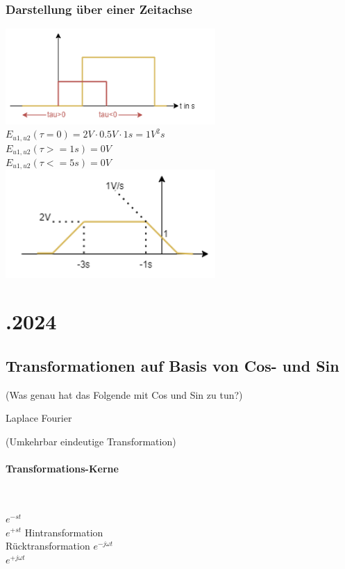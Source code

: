 \documentclass{article}
\begin{document}
\subsubsection*{Darstellung über einer Zeitachse}
\includegraphics[width=0.6\textwidth]{img/2024_11_27_kreuzkorrelation.png} \\
$E_{u1,u2}(\tau = 0) = 2V \cdot 0.5V \cdot 1s = 1V^2s$ \\
$E_{u1,u2}(\tau >= 1s) = 0V$ \\
$E_{u1,u2}(\tau <= 5s) = 0V$ \\
\includegraphics[width=0.6\textwidth]{img/2024_11_27_kreuzkorrelation_multiplikation.png}


\newpage
\section*{.2024}
\subsection*{Transformationen auf Basis von Cos- und Sin}
(Was genau hat das Folgende mit Cos und Sin zu tun?)
\begin{center}
	\begin{paracol}{2}
		Laplace
		\switchcolumn
		Fourier
	\end{paracol}
	(Umkehrbar eindeutige Transformation)
	\paragraph{Transformations-Kerne} \mbox{} \\
	\begin{paracol}{3}
		$e^{-st}$ \\
		$e^{+st}$
		\switchcolumn
		Hintransformation \\
		Rücktransformation
		\switchcolumn
		$e^{-j\omega t}$ \\
		$e^{+j\omega t}$
	\end{paracol}	
\end{center}
\end{document}
